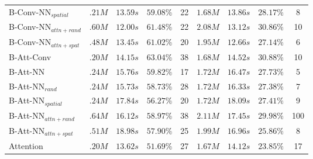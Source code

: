 \documentclass{article}
\begin{document}
\begin{table}[h]
\begin{threeparttable}
\begin{tabular*}{\textwidth}{@{\extracolsep\fill}l|cccc|cccc}
      B-Conv-NN\(_{spatial}\)         & \(.21M\) & \(13.59s\) & \(59.08\%\) & 22
                                      & \(1.68M\) & \(13.86s\) & \(28.17\%\) & 8\\
      B-Conv-NN\(_{attn+rand}\)       & \(.60M\) & \(12.00s\) & \(61.48\%\) & 22
                                      & \(2.08M\) & \(13.12s\) & \(\bm{30.86}\%\) & 10\\
      B-Conv-NN\(_{attn+spat}\)       & \(.48M\) & \(13.45s\) & \(61.02\%\) & 20 
                                      & \(1.95M\) & \(12.66s\) & \(27.14\%\) & 6 \\
      \midrule 
      B-Att-Conv                      & \(.20M\) & \(14.15s\) & \(\bm{63.04}\%\) & 38
                                      & \(1.68M\) & \(14.52s\) & \(\bm{30.88}\%\) & 10\\

      \midrule 
      B-Att-NN                        & \(.24M\) & \(15.76s\) & \(59.82\%\) & 17
                                      & \(1.72M\) & \(16.47s\) & \(27.73\%\) & 5\\
      B-Att-NN\(_{rand}\)             & \(.24M\) & \(15.73s\) & \(58.73\%\) & 28
                                      & \(1.72M\) & \(16.33s\) & \(27.38\%\) & 7\\
      B-Att-NN\(_{spatial}\)          & \(.24M\) & \(17.84s\) & \(56.27\%\) & 20
                                      & \(1.72M\) & \(18.09s\) & \(27.41\%\) & 9\\
      B-Att-NN\(_{attn+rand}\)        & \(.64M\) & \(16.12s\) & \(58.97\%\) & 38
                                      & \(2.11M\) & \(17.45s\) & \(29.98\%\) & 100\\
      B-Att-NN\(_{attn+spat}\)        & \(.51M\) & \(18.98s\) & \(57.90\%\) & 25
                                      & \(1.99M\) & \(16.96s\) & \(25.86\%\) & 8\\
                                            
      \midrule
      Attention                       & \(.20M\) & \(13.62s\) & \(51.69\%\) & 27 
                                      & \(1.67M\) & \(14.12s\) & \(23.85\%\) & 17\\

      \bottomrule
    \end{tabular*}
    

\end{threeparttable}
\end{table}
\end{document}
